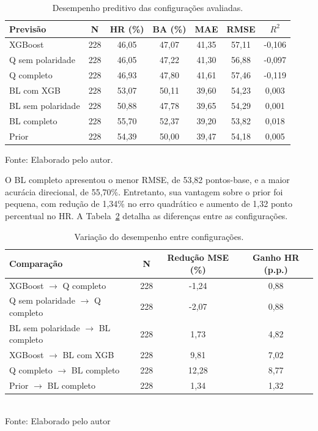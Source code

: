 \begin{table}[H]
\centering
\caption{Desempenho preditivo das configurações avaliadas.}
\label{tab:desempenho_camadas}
{\footnotesize
\renewcommand{\arraystretch}{0.85}
\begin{tabular}{@{}lcccccc@{}}
\hline
Previsão & N & HR (\%) & BA (\%) & MAE & RMSE & $R^2$ \\
\hline
XGBoost & 228 & 46,05 & 47,07 & 41,35 & 57,11 & -0,106 \\
Q sem polaridade & 228 & 46,05 & 47,22 & 41,30 & 56,88 & -0,097 \\
Q completo & 228 & 46,93 & 47,80 & 41,61 & 57,46 & -0,119 \\
BL com XGB & 228 & 53,07 & 50,11 & 39,60 & 54,23 & 0,003 \\
BL sem polaridade & 228 & 50,88 & 47,78 & 39,65 & 54,29 & 0,001 \\
BL completo & 228 & 55,70 & 52,37 & 39,20 & 53,82 & 0,018 \\
Prior & 228 & 54,39 & 50,00 & 39,47 & 54,18 & 0,005 \\
\hline
\end{tabular}}
\par{}
\par
Fonte: Elaborado pelo autor.
\end{table}
O BL completo apresentou o menor RMSE, de 53,82 pontos-base,
e a maior acurácia direcional, de 55,70\%. Entretanto, sua
vantagem sobre o prior foi pequena, com redução de 1,34\% no
erro quadrático e aumento de 1,32 ponto percentual no HR.
\newpage
A Tabela~\ref{tab:efeitos_camadas} detalha as diferenças
entre as configurações.

\begin{table}[H]
\centering
\caption{Variação do desempenho entre configurações.}
\label{tab:efeitos_camadas}
{\footnotesize
\begin{tabular}{@{}lccc@{}}
\hline
Comparação & N & Redução MSE (\%) & Ganho HR (p.p.) \\
\hline
XGBoost $\rightarrow$ Q completo & 228 & -1,24 & 0,88 \\
Q sem polaridade $\rightarrow$ Q completo &
228 & -2,07 & 0,88 \\
BL sem polaridade $\rightarrow$ BL completo &
228 & 1,73 & 4,82 \\
XGBoost $\rightarrow$ BL com XGB & 228 & 9,81 & 7,02 \\
Q completo $\rightarrow$ BL completo & 228 & 12,28 & 8,77 \\
Prior $\rightarrow$ BL completo & 228 & 1,34 & 1,32 \\
\hline
\end{tabular}}
\par{}\\
Fonte: Elaborado pelo autor
\end{table}

